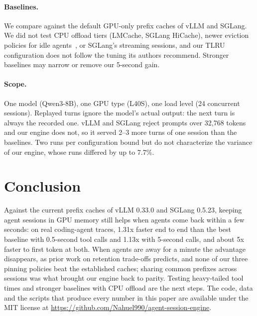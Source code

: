 \documentclass[11pt]{article}
\begin{document}
\paragraph{Baselines.} We compare against the default GPU-only prefix caches of vLLM and SGLang. We did not test CPU offload tiers (LMCache, SGLang HiCache), newer eviction policies for idle agents~\cite{rrevict,penelope}, or SGLang's streaming sessions, and our TLRU configuration does not follow the tuning its authors recommend. Stronger baselines may narrow or remove our 5-second gain.

\paragraph{Scope.} One model (Qwen3-8B), one GPU type (L40S), one load level (24 concurrent sessions). Replayed turns ignore the model's actual output: the next turn is always the recorded one. vLLM and SGLang reject prompts over 32,768 tokens and our engine does not, so it served 2--3 more turns of one session than the baselines. Two runs per configuration bound but do not characterize the variance of our engine, whose runs differed by up to 7.7\%.

\section{Conclusion}

Against the current prefix caches of vLLM 0.33.0 and SGLang 0.5.23, keeping agent sessions in GPU memory still helps when agents come back within a few seconds: on real coding-agent traces, 1.31x faster end to end than the best baseline with 0.5-second tool calls and 1.13x with 5-second calls, and about 5x faster to first token at both. When agents are away for a minute the advantage disappears, as prior work on retention trade-offs predicts, and none of our three pinning policies beat the established caches; sharing common prefixes across sessions was what brought our engine back to parity. Testing heavy-tailed tool times and stronger baselines with CPU offload are the next steps. The code, data and the scripts that produce every number in this paper are available under the MIT license at \url{https://github.com/Nahuel990/agent-session-engine}.
\end{document}

